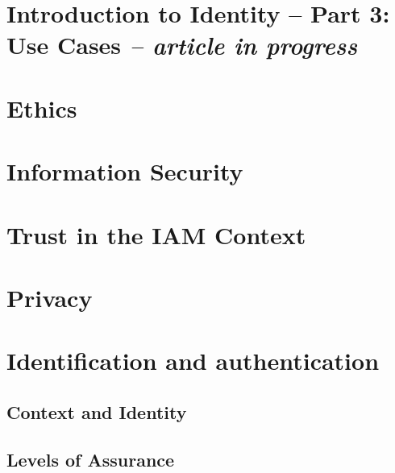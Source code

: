\hypertarget{introduction-to-identity-part-3-use-cases-article-in-progress}{%
\section{\texorpdfstring{Introduction to Identity -- Part 3: Use
Cases \emph{-- article in
progress}}{Introduction to Identity -- Part 3: Use Cases -- article in progress}}\label{introduction-to-identity-part-3-use-cases-article-in-progress}}

\hypertarget{ethics}{%
\section{\texorpdfstring{Ethics }{Ethics }}\label{ethics}}

\hypertarget{information-security}{%
\section{Information Security}\label{information-security}}

\hypertarget{trust-in-the-iam-context}{%
\section{Trust in the IAM Context}\label{trust-in-the-iam-context}}

\hypertarget{privacy}{%
\section{Privacy}\label{privacy}}

\hypertarget{identification-and-authentication}{%
\section{Identification and
authentication}\label{identification-and-authentication}}

\hypertarget{context-and-identity}{%
\subsection{Context and Identity}\label{context-and-identity}}

\hypertarget{levels-of-assurance}{%
\subsection{Levels of Assurance}\label{levels-of-assurance}}

